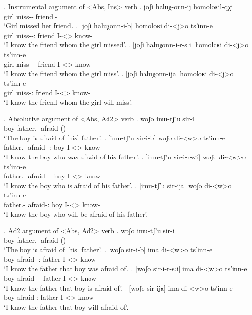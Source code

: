 \ex. Instrumental argument of <Abs, Ins> verb
	\ag. joʃi haluχ-onn-ij homoloʁil-qχi\\
			{girl} {miss-\Pst-\Pf} {friend.\Obl-\Inst}\\
			\glt `Girl missed her friend'.
	\bg. [joʃi haluχonn-i-b] homoloʁi di-<j>o ts'inn-e\\
			{girl} {miss-\Pst-\Ptcp:\Pst} friend {I-<\M>\Aff} {know-\Hab}\\
			\glt `I know the friend whom the girl missed'.
	\bg. [joʃi haluχonn-i-r-sːi] homoloʁi di-<j>o ts'inn-e\\
			{girl} {miss-\Pst-\Prog-\Attr} friend {I-<\M>\Aff} {know-\Hab}\\
			\glt `I know the friend whom the girl miss'.			
	\bg. [joʃi haluχonn-ija] homoloʁi di-<j>o ts'inn-e\\
			{girl} {miss-\Ptcp:\Fut} friend {I-<\M>\Aff} {know-\Hab}\\
			\glt `I know the friend whom the girl will miss'.

\ex. Absolutive argument of <Abs, Ad2> verb
	\ag. woʃo imu-tʃ'u sir-i\\
			{boy} {father.\Obl-\Ads} {afraid-\Pst(\Aor)}\\
			\glt `The boy is afraid of [his] father'.
	\bg. [imu-tʃ'u sir-i-b] woʃo di-<w>o ts'inn-e\\
			{father.\Obl-\Ads} {afraid-\Pst-\Ptcp:\Pst} boy {I-<\M>\Aff} {know-\Hab} \\
			\glt `I know the boy who was afraid of his father'.
	\bg. [imu-tʃ'u sir-i-r-sːi] woʃo di-<w>o ts'inn-e\\
			{father.\Obl-\Ads} {afraid-\Pst-\Prog-\Attr} boy {I-<\M>\Aff} {know-\Hab} \\
			\glt `I know the boy who is afraid of his father'.			
	\bg. [imu-tʃ'u sir-ija] woʃo di-<w>o ts'inn-e\\
			{father.\Obl-\Ads} {afraid-\Ptcp:\Fut} boy {I-<\M>\Aff} {know-\Hab} \\
			\glt `I know the boy who will be afraid of his father'.

\ex. Ad2 argument of <Abs, Ad2> verb
	\ag. woʃo imu-tʃ'u sir-i\\
			{boy} {father.\Obl-\Ads} {afraid-\Pst(\Aor)}\\
			\glt `The boy is afraid of [his] father'.
	\bg. [woʃo sir-i-b] ima di-<w>o ts'inn-e\\
			{boy} {afraid-\Pst-\Ptcp:\Pst} father {I-<\M>\Aff} {know-\Hab} \\
			\glt `I know the father that boy was afraid of'.
	\bg. [woʃo sir-i-r-sːi] ima di-<w>o ts'inn-e\\
			{boy} {afraid-\Pst-\Prog-\Attr} father {I-<\M>\Aff} {know-\Hab} \\
			\glt `I know the father that boy is afraid of'.			
	\bg. [woʃo sir-ija] ima di-<w>o ts'inn-e\\
			{boy} {afraid-\Ptcp:\Fut} father {I-<\M>\Aff} {know-\Hab} \\
			\glt `I know the father that boy will afraid of'.
			
